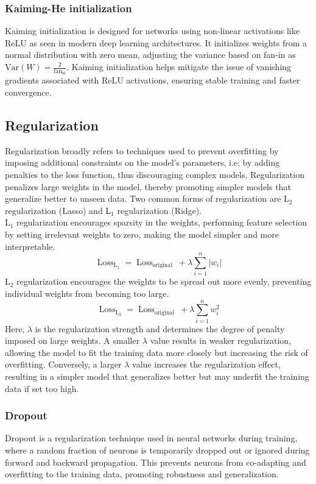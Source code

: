 \subsubsection{Kaiming-He initialization}
Kaiming initialization \cite{he2015} is designed for networks using non-linear activations like ReLU as seen in modern deep learning architectures. It initializes weights from a normal distribution with zero mean, adjusting the variance based on fan-in as $ \text{Var}(W) = \frac{2}{\text{fan}_{\text{in}}}$. Kaiming initialization helps mitigate the issue of vanishing gradients associated with ReLU activations, ensuring stable training and faster convergence.
\subsection{Regularization}
Regularization broadly refers to techniques used to prevent overfitting by imposing additional constraints on the model's parameters, i.e; by adding penalties to the loss function, thus discouraging complex models. Regularization penalizes large weights in the model, thereby promoting simpler models that generalize better to unseen data. Two common forms of regularization are L$_2$ regularization (Lasso) and L$_1$ regularization (Ridge). \\
L$_1$ regularization encourages sparsity in the weights, performing feature selection by setting irrelevant weights to zero, making the model simpler and more interpretable. 
\[ \operatorname{Loss}_{\mathrm{L}_1}=\operatorname{Loss}_{\text {original }}+\lambda \sum_{i=1}^n\left|w_i\right| \]
L$_2$ regularization encourages the weights to be spread out more evenly, preventing individual weights from becoming too large.
\[ \operatorname{Loss}_{\mathrm{L}_2}=\operatorname{Loss}_{\text {original }}+\lambda \sum_{i=1}^n w^2_i \]
Here, $\lambda$ is the regularization strength and determines the degree of penalty imposed on large weights. A smaller $\lambda$ value results in weaker regularization, allowing the model to fit the training data more closely but increasing the risk of overfitting. Conversely, a larger $\lambda$ value increases the regularization effect, resulting in a simpler model that generalizes better but may underfit the training data if set too high.
\subsubsection{Dropout}
Dropout is a regularization technique used in neural networks during training, where a random fraction of neurons is temporarily dropped out or ignored during forward and backward propagation. This prevents neurons from co-adapting and overfitting to the training data, promoting robustness and generalization. 
